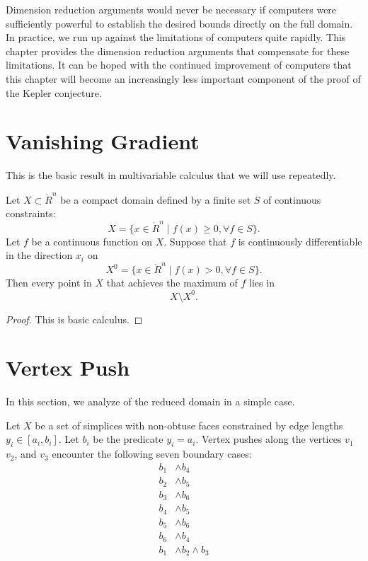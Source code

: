 Dimension reduction arguments would never be necessary if
computers were sufficiently powerful to establish the desired
bounds directly on the full domain.  In practice, we run up
against the limitations of computers quite rapidly.  This chapter
provides the dimension reduction arguments that compensate for
these limitations.  It can be hoped with the continued improvement
of computers that this chapter will become an increasingly less
important component of the proof of the Kepler conjecture.

\section{Vanishing Gradient}\label{sec:gradient}

This is the basic result in multivariable calculus that we will
use repeatedly.

\begin{lemma}  Let $X\subset\ring{R}^n$ be a compact domain
defined by a finite set $S$ of continuous constraints:
    $$X =\{x\in\ring{R}^n\mid f(x)\ge 0, \forall f\in S\}.$$
Let $f$ be a continuous function on $X$.  Suppose that $f$ is
continuously differentiable in the direction $x_i$ on
    $$X^0= \{x\in\ring{R}^n\mid f(x) > 0, \forall f\in S\}.$$
Then every point in $X$ that achieves the maximum of $f$ lies in
    $$X \setminus X^0.$$
\end{lemma}

\begin{proof} This is basic calculus.
\end{proof}

\section{Vertex Push}\label{sec:push}

In this section, we analyze of the reduced domain in a simple
case.

\begin{lemma}  Let $X$ be a set of simplices with non-obtuse faces constrained by edge
lengths $y_i\in[a_i,b_i]$.  Let $b_i$ be the predicate $y_i =
a_i$.  Vertex pushes along the vertices $v_1$ $v_2$, and $v_3$
encounter the following seven boundary cases:
    $$
    \begin{array}{rlll}
    b_1 &\land b_4 \\
    b_2 &\land b_5 \\
    b_3 &\land b_6 \\
    b_4 &\land b_5 \\
    b_5 &\land b_6 \\
    b_6 &\land b_4 \\
    b_1 &\land b_2 \land b_3
    \end{array}
    $$
\end{lemma}

